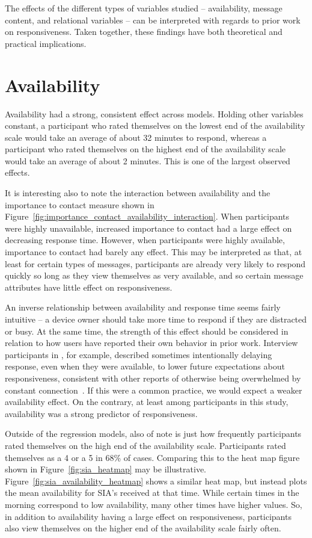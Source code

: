 \documentclass[12pt]{nuthesis}	%
\begin{document}
The effects of the different types of variables studied -- availability, message content, and relational variables -- can be interpreted with regards to prior work on responsiveness. Taken together, these findings have both theoretical and practical implications.

\section{Availability}

Availability had a strong, consistent effect across models. Holding other variables constant, a participant who rated themselves on the lowest end of the availability scale would take an average of about 32 minutes to respond, whereas a participant who rated themselves on the highest end of the availability scale would take an average of about 2 minutes. This is one of the largest observed effects.

It is interesting also to note the interaction between availability and the importance to contact measure shown in Figure~\ref{fig:importance_contact_availability_interaction}. When participants were highly unavailable, increased importance to contact had a large effect on decreasing response time. However, when participants were highly available, importance to contact had barely any effect. This may be interpreted as that, at least for certain types of messages, participants are already very likely to respond quickly so long as they view themselves as very available, and so certain message attributes have little effect on responsiveness.

An inverse relationship between availability and response time seems fairly intuitive -- a device owner should take more time to respond if they are distracted or busy. At the same time, the strength of this effect should be considered in relation to how users have reported their own behavior in prior work. Interview participants in \citet{wohn2015ambient}, for example, described sometimes intentionally delaying response, even when they were available, to lower future expectations about responsiveness, consistent with other reports of otherwise being overwhelmed by constant connection~\citep[e.g.,][]{ames2013managing,hall2012calling}. If this were a common practice, we would expect a weaker availability effect. On the contrary, at least among participants in this study, availability was a strong predictor of responsiveness.

Outside of the regression models, also of note is just how frequently participants rated themselves on the high end of the availability scale. Participants rated themselves as a 4 or a 5 in 68\% of cases. Comparing this to the heat map figure shown in Figure~\ref{fig:sia_heatmap} may be illustrative. Figure~\ref{fig:sia_availability_heatmap} shows a similar heat map, but instead plots the mean availability for SIA's received at that time. While certain times in the morning correspond to low availability, many other times have higher values. So, in addition to availability having a large effect on responsiveness, participants also view themselves on the higher end of the availability scale fairly often.
\end{document}
